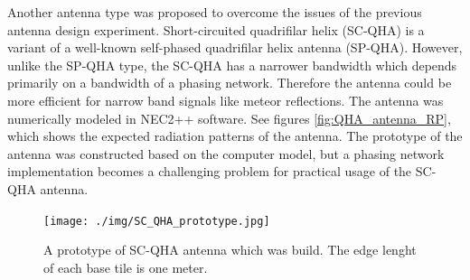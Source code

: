 \documentclass[twoside]{ctuthesis}
\theoremstyle{plain}
\theoremstyle{definition}
\theoremstyle{note}
\begin{document}
Another antenna type was proposed \cite{Bolidozor_QHA} to overcome the issues of the previous antenna design experiment.  Short-circuited quadrifilar helix (SC-QHA) is a variant of a well-known self-phased quadrifilar helix antenna (SP-QHA). However, unlike the SP-QHA type, the  SC-QHA has a narrower bandwidth which depends primarily on a bandwidth of a phasing network. Therefore the antenna could be more efficient for narrow band signals like meteor reflections.  The antenna was numerically modeled in NEC2++ software. See figures \ref{fig:QHA_antenna_RP}, which shows the expected radiation patterns of the antenna.  The prototype of the antenna was constructed based on the computer model, but a phasing network implementation becomes a challenging problem for practical usage of the SC-QHA antenna. 

\begin{figure}
 \begin{center}
 \texttt{[image: ./img/SC\_QHA\_prototype.jpg]}
 \caption{A prototype of SC-QHA antenna which was build. The edge lenght of each base tile is one meter.  }
  \label{fig:QHA_antenna} 
 \end{center}
\end{figure}
\end{document}
